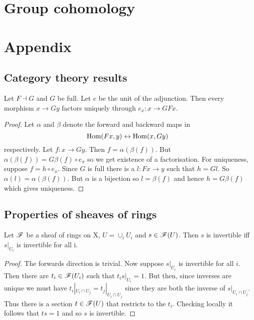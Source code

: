 \documentclass{memoir}
\begin{document}
\chapter{Group cohomology}

\chapter{Appendix}
\section{Category theory results}
\begin{proposition}
    \label{prop:cat_factor}
    Let $F\dashv G$ and $G$ be full.
    Let $e$ be the unit of the adjunction.
    Then every morphism $x\to Gy$ factors uniquely through $e_x:x\to GFx$.
\end{proposition}
\begin{proof}
    Let $\alpha$ and $\beta$ denote the forward and backward maps in
    \begin{equation}
        \operatorname{Hom}(Fx,y) \leftrightarrow \operatorname{Hom}(x,Gy)
    \end{equation}
    respectively.
    Let $f:x\to Gy$.
    Then $f = \alpha(\beta(f))$.
    But $\alpha(\beta(f)) = G\beta(f)\circ e_x$ so we get existence of a factorisation.
    For uniqueness, suppose $f = h\circ e_x$.
    Since $G$ is full there is a $l:Fx\to y$ such that $h = Gl$.
    So $\alpha(l) = \alpha(\beta(f))$.
    But $\alpha$ is a bijection so $l = \beta(f)$ and hence $h = G\beta(f)$ which gives uniqueness.
\end{proof}

\section{Properties of sheaves of rings}
\begin{thm}
    Let $\mathscr{F}$ be a sheaf of rings on X, $U = \cup_iU_i$ and $s\in \mathscr{F}(U)$.
    Then $s$ is invertible iff $s|_{U_i}$ is invertible for all i.
\end{thm}
\begin{proof}
    The forwards direction is trivial. Now suppose $s|_{U_i}$ is invertible for all $i$.
    Then there are $t_i\in\mathscr{F}(U_i)$ such that $t_is|_{U_i} = 1$.
    But then, since inverses are unique we must have $t_i|_{U_i\cap U_j} = t_j|_{U_i\cap U_j}$ since they are both the inverse of $s|_{U_i\cap U_j}$.
    Thus there is a section $t\in \mathscr{F}(U)$ that restricts to the $t_i$.
    Checking locally it follows that $ts = 1$ and so $s$ is invertible.
\end{proof}
\end{document}
